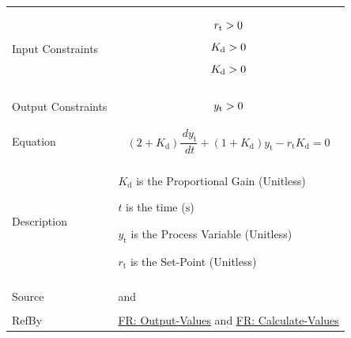 \documentclass[12pt]{article}
\newcommand{\gt}{\ensuremath >}
\begin{document}
\begin{minipage}{\textwidth}
\begin{tabular}{>{\raggedright}p{}>{\raggedright\arraybackslash}p{}}
\\ \midrule \\
Input Constraints & \begin{displaymath}
                    {r_{\text{t}}}\gt{}0
                    \end{displaymath}
                    \begin{displaymath}
                    {K_{\text{d}}}\gt{}0
                    \end{displaymath}
                    \begin{displaymath}
                    {K_{\text{d}}}\gt{}0
                    \end{displaymath}
\\ \midrule \\
Output Constraints & \begin{displaymath}
                     {y_{\text{t}}}\gt{}0
                     \end{displaymath}
\\ \midrule \\
Equation & \begin{displaymath}
           \left(2+{K_{\text{d}}}\right) \frac{\,d{y_{\text{t}}}}{\,dt}+\left(1+{K_{\text{d}}}\right) {y_{\text{t}}}-{r_{\text{t}}} {K_{\text{d}}}=0
           \end{displaymath}
\\ \midrule \\
Description & \begin{symbDescription}
              \item{${K_{\text{d}}}$ is the Proportional Gain (Unitless)}
              \item{$t$ is the time (${\text{s}}$)}
              \item{${y_{\text{t}}}$ is the Process Variable (Unitless)}
              \item{${r_{\text{t}}}$ is the Set-Point (Unitless)}
              \end{symbDescription}
\\ \midrule \\
Source & \cite{abbasi2015} and \cite{johnson2008}
         
\\ \midrule \\
RefBy & \hyperref[outputValues]{FR: Output-Values} and \hyperref[calculateValues]{FR: Calculate-Values}
        
\\ \bottomrule
\end{tabular}
\end{minipage}
\end{document}
